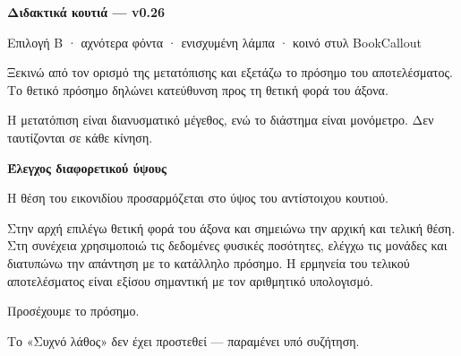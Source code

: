 \pagestyle{empty}
{\BookHeadingFont\fontsize{15}{19}\selectfont\bfseries\color{BookPrimary}Διδακτικά κουτιά — v0.26}\par
{\small Επιλογή Β · αχνότερα φόντα · ενισχυμένη λάμπα · κοινό στυλ BookCallout}\par\medskip
\begin{ThinkBox}
Ξεκινώ από τον ορισμό της μετατόπισης και εξετάζω το πρόσημο του αποτελέσματος. Το θετικό πρόσημο δηλώνει κατεύθυνση προς τη θετική φορά του άξονα.
\end{ThinkBox}
\begin{AttentionBox}
Η μετατόπιση είναι διανυσματικό μέγεθος, ενώ το διάστημα είναι μονόμετρο. Δεν ταυτίζονται σε κάθε κίνηση.
\end{AttentionBox}
\medskip
{\BookHeadingFont\bfseries\color{BookPrimary}Έλεγχος διαφορετικού ύψους}\par
{\small Η θέση του εικονιδίου προσαρμόζεται στο ύψος του αντίστοιχου κουτιού.}\par\smallskip
\begin{ThinkBox}
Στην αρχή επιλέγω θετική φορά του άξονα και σημειώνω την αρχική και τελική θέση.
Στη συνέχεια χρησιμοποιώ τις δεδομένες φυσικές ποσότητες, ελέγχω τις μονάδες
και διατυπώνω την απάντηση με το κατάλληλο πρόσημο. Η ερμηνεία του τελικού
αποτελέσματος είναι εξίσου σημαντική με τον αριθμητικό υπολογισμό.
\end{ThinkBox}
\begin{AttentionBox}
Προσέχουμε το πρόσημο.
\end{AttentionBox}
\vfill
{\footnotesize\color{BookInk}Το «Συχνό λάθος» δεν έχει προστεθεί — παραμένει υπό συζήτηση.}\par
